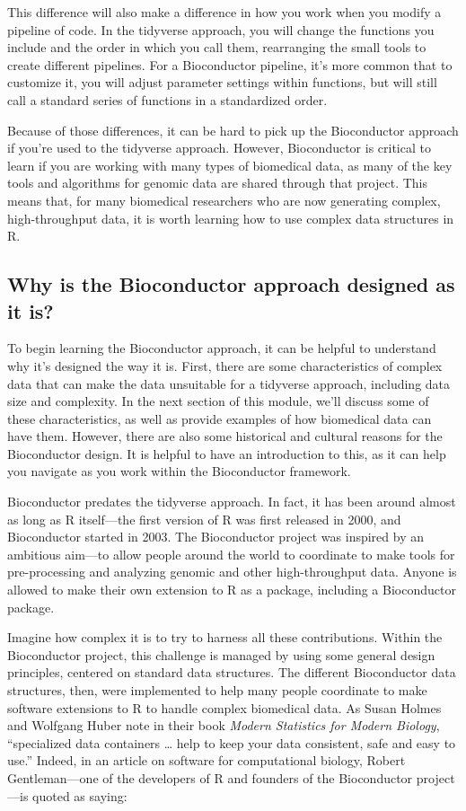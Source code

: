 \documentclass[]{tufte-book}
\begin{document}
This difference will also make a difference in how you work when you modify a
pipeline of code. In the tidyverse approach, you will change the functions you
include and the order in which you call them, rearranging the small tools to
create different pipelines. For a Bioconductor pipeline, it's more common that
to customize it, you will adjust parameter settings within functions, but will
still call a standard series of functions in a standardized order.

Because of those differences, it can be hard to pick up the Bioconductor
approach if you're used to the tidyverse approach. However, Bioconductor is
critical to learn if you are working with many types of biomedical data, as many
of the key tools and algorithms for genomic data are shared through that
project. This means that, for many biomedical researchers who are now generating
complex, high-throughput data, it is worth learning how to use complex data
structures in R.

\subsection{Why is the Bioconductor approach designed as it is?}\label{why-is-the-bioconductor-approach-designed-as-it-is}

To begin learning the Bioconductor approach, it can be helpful to understand why
it's designed the way it is. First, there are some characteristics of complex
data that can make the data unsuitable for a tidyverse approach, including data
size and complexity. In the next section of this module, we'll discuss some of
these characteristics, as well as provide examples of how biomedical data can
have them. However, there are also some historical and cultural reasons for the
Bioconductor design. It is helpful to have an introduction to this, as it can
help you navigate as you work within the Bioconductor framework.

Bioconductor predates the tidyverse approach. In fact, it has been around almost
as long as R itself---the first version of R was first released in 2000, and
Bioconductor started in 2003. The Bioconductor project was inspired by an
ambitious aim---to allow people around the world to coordinate to make tools for
pre-processing and analyzing genomic and other high-throughput data. Anyone is
allowed to make their own extension to R as a package, including a Bioconductor
package.

Imagine how complex it is to try to harness all these contributions. Within the
Bioconductor project, this challenge is managed by using some general design
principles, centered on standard data structures. The different Bioconductor
data structures, then, were implemented to help many people coordinate to make
software extensions to R to handle complex biomedical data. As Susan Holmes and
Wolfgang Huber note in their book \emph{Modern Statistics for Modern Biology},
``specialized data containers \ldots{} help to keep your data consistent, safe and
easy to use.'' \citep{holmes2018modern} Indeed, in an article on software for
computational biology, Robert Gentleman---one of the developers of R and
founders of the Bioconductor project---is quoted as saying:
\end{document}
